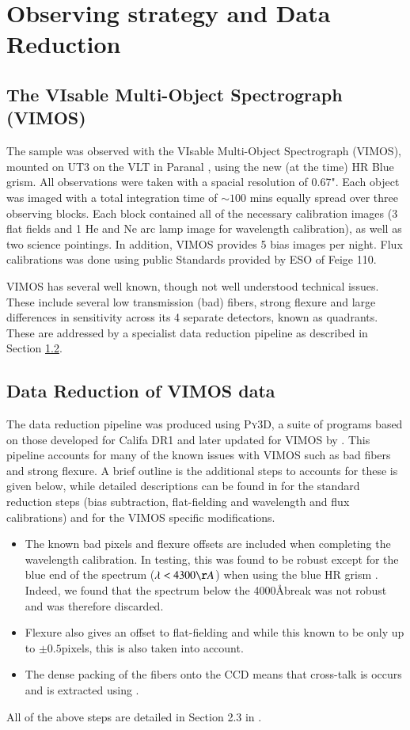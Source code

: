 \documentclass[fleqn,usenatbib,useAMS]{mnras}
\begin{document}
\section{Observing strategy and Data Reduction}
	\label{sec:obs}
	\subsection{The VIsable Multi-Object Spectrograph (VIMOS)}
		\label{subsec:VIMOS}
		The sample was observed with the VIsable Multi-Object Spectrograph (VIMOS), mounted on UT3 on the VLT in Paranal \citep{LeFevre2003}, using the new (at the time) HR Blue grism. All observations were taken with a spacial resolution of 0.67". Each object was imaged with a total integration time of $\sim 100$ mins equally spread over three observing blocks. Each block contained all of the necessary calibration images (3 flat fields and 1 He and Ne arc lamp image for wavelength calibration), as well as two science pointings. In addition, VIMOS provides 5 bias images per night. Flux calibrations was done using public Standards provided by ESO of Feige 110.

		VIMOS has several well known, though not well understood technical issues. These include several low transmission (bad) fibers, strong flexure and large differences in sensitivity across its 4 separate detectors, known as quadrants. These are addressed by a specialist data reduction pipeline as described in Section \ref{subsec:reduct}. 

	\subsection{Data Reduction of VIMOS data}
		\label{subsec:reduct}
		The data reduction pipeline was produced using \textsc{Py3D}, a suite of programs based on those developed for Califa DR1 \citep{Sanchez2011, Husemann2013} and later updated for VIMOS by \citet{Husemann2014}. This pipeline accounts for many of the known issues with VIMOS such as bad fibers and strong flexure. A brief outline is the additional steps to accounts for these is given below, while detailed descriptions can be found in \citet{Sanchez2011} for the standard reduction steps (bias subtraction, flat-fielding and wavelength and flux calibrations) and \citep{Husemann2014} for the VIMOS specific modifications. 
		\begin{itemize}
		\item The known bad pixels and flexure offsets are included when completing the wavelength calibration. In testing, this was found to be robust except for the blue end of the spectrum ($\lambda < 4300 \AA$) when using the blue HR grism \citep{Husemann2014}. Indeed, we found that the spectrum below the 4000\AA break was not robust and was therefore discarded.
		\item Flexure also gives an offset to flat-fielding and while this known to be only up to $\pm0.5$pixels, this is also taken into account.
		\item The dense packing of the fibers onto the CCD means that cross-talk is occurs and is extracted using \citep{Horne1986}. 
		\end{itemize}
		All of the above steps are detailed in Section 2.3 in \citet{Husemann2014}.
\end{document}
